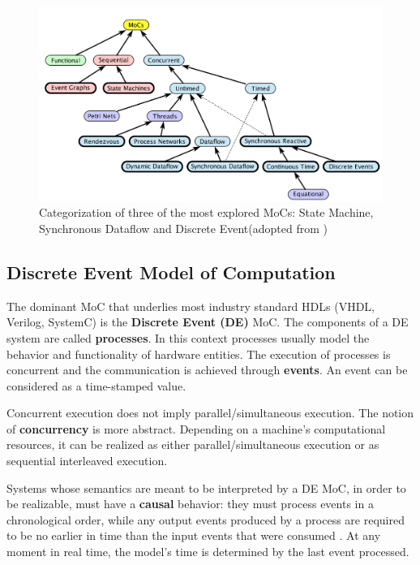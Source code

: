 \documentclass[12pt,twoside]{article}
\begin{document}
\begin{figure}[htb]
\centering
\includegraphics[scale=.45]{Figures/MoCs.png}
\caption{\label{fig:MoCs}Categorization of three of the most explored MoCs: State Machine, Synchronous Dataflow and Discrete Event(adopted from \cite{Editor2014})}
\end{figure}


\subsection{Discrete Event Model of Computation}
\label{sec-4-2}
The dominant MoC that underlies most industry standard HDLs (VHDL, Verilog, SystemC) is the \textbf{Discrete Event (DE)} MoC.
The components of a DE system are called \textbf{processes}.
In this context processes usually model the behavior and functionality of hardware entities.
The execution of processes is concurrent and the communication is achieved through \textbf{events}.
An event can be considered as a time-stamped value.

Concurrent execution does not imply parallel/simultaneous execution. 
The notion of \textbf{concurrency} is more abstract. 
Depending on a machine's computational resources, it can be realized as either parallel/simultaneous execution or as sequential interleaved execution.

Systems whose semantics are meant to be interpreted by a DE MoC, in order to be realizable, must have a \textbf{causal} behavior: they must process events in a chronological order, 
while any output events produced by a process are required to be no earlier in time than the input events that were consumed \cite{Editor2014}.
At any moment in real time, the model's time is determined by the last event processed.
\end{document}
